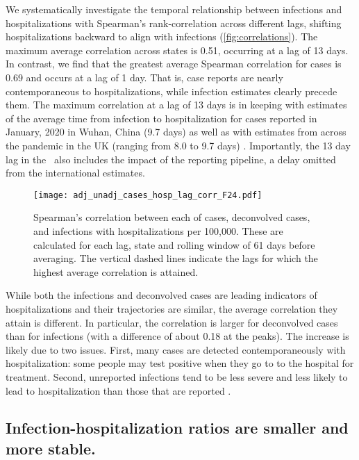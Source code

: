 We systematically investigate the temporal relationship between infections and
hospitalizations with Spearman's rank-correlation across different lags,
shifting hospitalizations backward to align with infections
(\autoref{fig:correlations}). The maximum average correlation across states is
0.51, occurring at a lag of 13 days. In contrast, we find that the greatest
average Spearman correlation for cases is 0.69 and occurs at a lag of 1 day.
That is, case reports are nearly contemporaneous to hospitalizations, while
infection estimates clearly precede them. The maximum correlation at a lag of 13
days is in keeping with estimates of the average time from infection to
hospitalization for cases reported in January, 2020 in Wuhan, China (9.7 days)
as well as with estimates from across the pandemic in the UK (ranging from 8.0
to 9.7 days) \citep{ward2021understanding}. Importantly, the 13 day lag in the
\US\ also includes the impact of the reporting pipeline, a delay omitted from
the international estimates. 

\begin{figure}[!tb]
\centering
\texttt{[image: adj\_unadj\_cases\_hosp\_lag\_corr\_F24.pdf]} 
\caption{Spearman's correlation between each of cases, deconvolved cases, and
infections with hospitalizations per 100,000. These are calculated for each lag,
state and rolling window of 61 days before averaging. The vertical dashed lines
indicate the lags for which the highest average correlation is attained.}
\label{fig:correlations}
\end{figure}
    

While both the infections and deconvolved cases are leading indicators of
hospitalizations and their trajectories are similar, the average correlation
they attain is different. In particular, the correlation is larger for
deconvolved cases than for infections (with a difference of about 0.18 at the
peaks). The increase is likely due to two issues. First, many cases are detected
contemporaneously with hospitalization: some people may test positive when they go to
to the hospital for treatment. Second, unreported infections tend to be
less severe and less likely to lead to hospitalization than those that are
reported \citep{sallahi2021using}.



\subsection{Infection-hospitalization ratios are smaller and more stable.}
\label{sec:ihrs}

